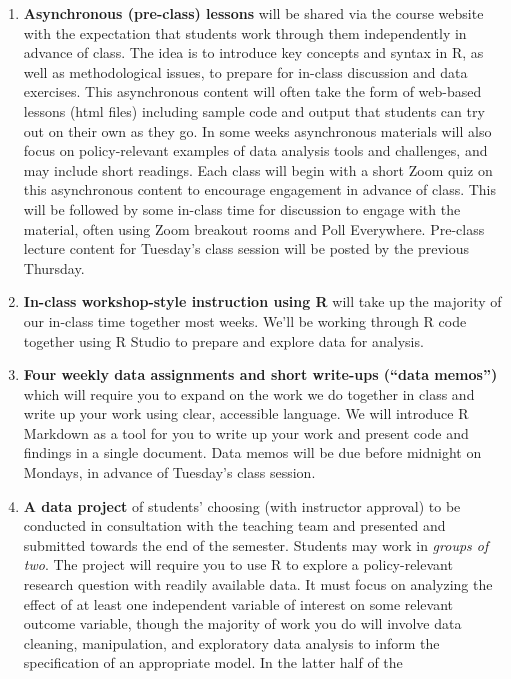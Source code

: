 \documentclass[11pt,]{article}
\begin{document}
\begin{enumerate}
\def\labelenumi{\arabic{enumi}.}
\item
  \textbf{Asynchronous (pre-class) lessons} will be shared via the
  course website with the expectation that students work through them
  independently in advance of class. The idea is to introduce key
  concepts and syntax in R, as well as methodological issues, to prepare
  for in-class discussion and data exercises. This asynchronous content
  will often take the form of web-based lessons (html files) including
  sample code and output that students can try out on their own as they
  go. In some weeks asynchronous materials will also focus on
  policy-relevant examples of data analysis tools and challenges, and
  may include short readings. Each class will begin with a short Zoom
  quiz on this asynchronous content to encourage engagement in advance
  of class. This will be followed by some in-class time for discussion
  to engage with the material, often using Zoom breakout rooms and Poll
  Everywhere. Pre-class lecture content for Tuesday's class session will
  be posted by the previous Thursday.
\item
  \textbf{In-class workshop-style instruction using R} will take up the
  majority of our in-class time together most weeks. We'll be working
  through R code together using R Studio to prepare and explore data for
  analysis.
\item
  \textbf{Four weekly data assignments and short write-ups (``data
  memos'')} which will require you to expand on the work we do together
  in class and write up your work using clear, accessible language. We
  will introduce R Markdown as a tool for you to write up your work and
  present code and findings in a single document. Data memos will be due
  before midnight on Mondays, in advance of Tuesday's class session.
\item
  \textbf{A data project} of students' choosing (with instructor
  approval) to be conducted in consultation with the teaching team and
  presented and submitted towards the end of the semester. Students may
  work in \emph{groups of two}. The project will require you to use R to
  explore a policy-relevant research question with readily available
  data. It must focus on analyzing the effect of at least one
  independent variable of interest on some relevant outcome variable,
  though the majority of work you do will involve data cleaning,
  manipulation, and exploratory data analysis to inform the
  specification of an appropriate model. In the latter half of the

\end{enumerate}
\end{document}
